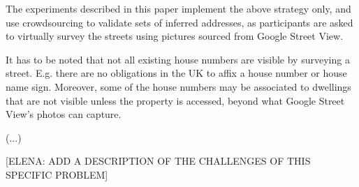     The experiments described in this paper implement the above strategy only, and  use crowdsourcing to validate sets of inferred addresses, as participants are asked to virtually survey the streets using pictures sourced from Google Street View.
    
    It has to be noted that not all existing house numbers are visible by surveying a street. E.g. there are no obligations in the UK to affix a house number or house name sign. Moreover, some of the house numbers may be associated to dwellings that are not visible unless the property is accessed, beyond what Google Street View's photos can capture.
    
    {(}...{)}
    
    [ELENA: ADD A DESCRIPTION OF THE CHALLENGES OF THIS SPECIFIC PROBLEM]

